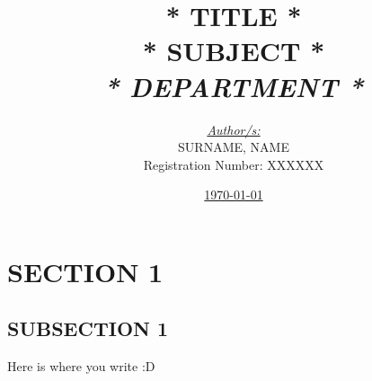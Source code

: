 \documentclass[12pt,a4paper, english]{article}
\title{
  \textbf{* TITLE *} \\[0.5cm]

  \textsc{* SUBJECT *} \\[0.5cm]

  \emph{* DEPARTMENT *}\\[1cm]
}
\author{
  \textit{\underline{Author/s:}}\\[0.2cm]

  \textsc{SURNAME, NAME}\\
  Registration Number: XXXXXX\\[0.2cm]

}
\date{
  \vfill\vfill\vfill
  \underline{\today}
}
\begin{document}
\clearpage\maketitle
\thispagestyle{empty}
\pagebreak

\renewcommand*\contentsname{Index of contents}
\tableofcontents
\pagebreak


\section{SECTION 1}
\subsection{SUBSECTION 1}


Here is where you write :D
\end{document}
